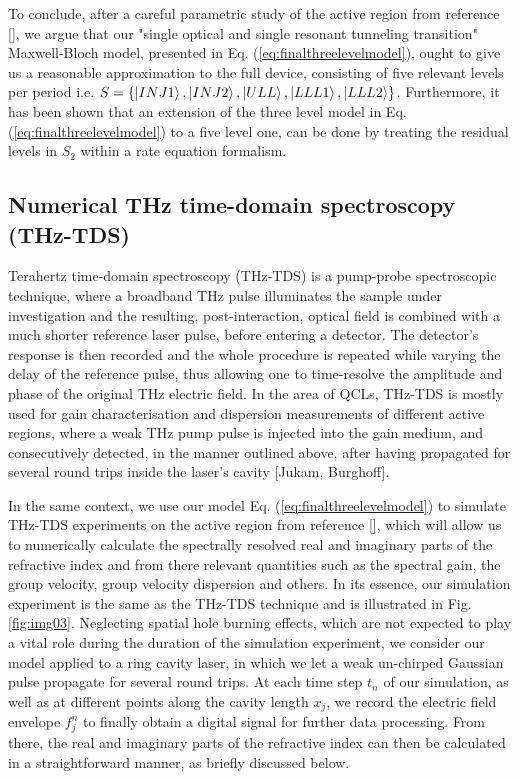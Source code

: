 \documentclass[10pt,letterpaper]{article}
\begin{document}
{ To conclude, after a careful parametric study of the active region from reference [], we argue that our "single optical and single resonant tunneling transition" Maxwell-Bloch model, presented in Eq. (\ref{eq:finalthreelevelmodel}), ought to give us a reasonable approximation to the full device, consisting of five relevant levels per period i.e. $S = \{\Ket{INJ1},\Ket{INJ2},\Ket{ULL},\Ket{LLL1},\Ket{LLL2}\}$. Furthermore, it has been shown that an extension of the three level model in Eq. (\ref{eq:finalthreelevelmodel}) to a five level one, can be done by treating the residual levels in $S_2$ within a rate equation formalism. 

\subsection{Numerical THz time-domain spectroscopy (THz-TDS)}
Terahertz time-domain spectroscopy (THz-TDS) is a pump-probe spectroscopic technique, where a broadband THz pulse illuminates the sample under investigation and the resulting, post-interaction, optical field is combined with a much shorter reference laser pulse, before entering a detector. The detector's response is then recorded and the whole procedure is repeated while varying the delay of the reference pulse, thus allowing one to time-resolve the amplitude and phase of the original THz electric field. In the area of QCLs, THz-TDS is mostly used for gain characterisation and dispersion measurements of different active regions, where a weak THz pump pulse is injected into the gain medium, and consecutively detected, in the manner outlined above, after having propagated for several round trips inside the laser's cavity [Jukam, Burghoff]. 

In the same context, we use our model Eq. (\ref{eq:finalthreelevelmodel}) to simulate THz-TDS experiments on the active region from reference [], which will allow us to numerically calculate the spectrally resolved real and imaginary parts of the refractive index and from there relevant quantities such as the spectral gain, the group velocity, group velocity dispersion and others. In its essence, our simulation experiment is the same as the THz-TDS technique and is illustrated in Fig. \ref{fig:img03}. Neglecting spatial hole burning effects, which are not expected to play a vital role during the duration of the simulation experiment, we consider our model applied to a ring cavity laser, in which we let a weak un-chirped Gaussian pulse propagate for several round trips. At each time step $t_n$ of our simulation, as well as at different points along the cavity length $x_j$, we record the electric field envelope $f_j^{n}$ to finally obtain a digital signal for further data processing. From there, the real and imaginary parts of the refractive index can then be calculated in a straightforward manner, as briefly discussed below. 

}
\end{document}
